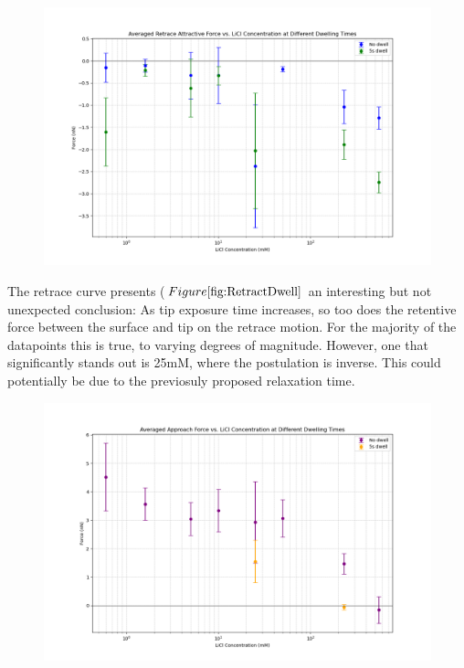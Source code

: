 \begin{figure}[h!]
\centering
\includegraphics[width=\textwidth]{chapter7/Dwell/Retrace overall.png}
\caption{}
\label{fig:RetractDwell}
\end{figure}

The retrace curve presents ($Figure \ref{fig:RetractDwell}$ an interesting but not unexpected conclusion: As tip exposure time increases, so too does the retentive force between the surface and tip on the retrace motion. For the majority of the datapoints this is true, to varying degrees of magnitude. However, one that significantly stands out is 25mM, where the postulation is inverse. This could potentially be due to the previosuly proposed relaxation time.

\begin{figure}[h!]
\centering
\includegraphics[width=\textwidth]{chapter7/Dwell/Approach overall.png}
\caption{}
\label{fig:ApproachDwell}
\end{figure}

